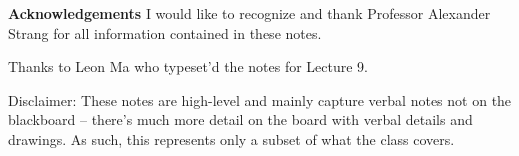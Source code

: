 {\textbf{Acknowledgements}}
I would like to recognize and thank Professor Alexander Strang for all information contained in these notes. 

Thanks to Leon Ma who typeset'd the notes for Lecture 9.

Disclaimer: These notes are high-level and mainly capture verbal notes not on the blackboard -- there's much more detail on the board with verbal details and drawings. As such, this represents only a subset of what the class covers.
